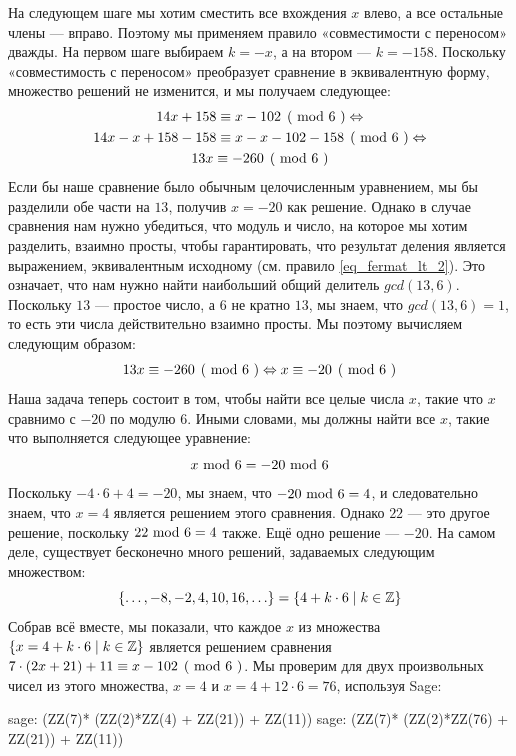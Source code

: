 \begin{example}
На следующем шаге мы хотим сместить все вхождения $x$ влево, а все остальные члены — вправо. Поэтому мы применяем правило «совместимости с переносом» дважды. На первом шаге выбираем $k=-x$, а на втором — $k=-158$.  Поскольку «совместимость с переносом» преобразует сравнение в эквивалентную форму, множество решений не изменится, и мы получаем следующее:
\begin{multline*}
\kongru{14x +158}{x-102}{6} \Leftrightarrow\\
\kongru{14x-x +158-158}{x-x-102-158}{6} \Leftrightarrow \\
\kongru{13x}{-260}{6}
\end{multline*}
Если бы наше сравнение было обычным целочисленным уравнением, мы бы разделили обе части на $13$, получив $x=-20$ как решение. Однако в случае сравнения нам нужно убедиться, что модуль и число, на которое мы хотим разделить, взаимно просты, чтобы гарантировать, что результат деления является выражением, эквивалентным исходному (см. правило \ref{eq_fermat_lt_2}). Это означает, что нам нужно найти наибольший общий делитель $gcd(13,6)$. Поскольку $13$ — простое число, а $6$ не кратно $13$, мы знаем, что $gcd(13,6)=1$, то есть эти числа действительно взаимно просты. Мы поэтому вычисляем следующим образом:
$$
\kongru{13x}{-260}{6} \Leftrightarrow \kongru{x}{-20}{6}
$$
Наша задача теперь состоит в том, чтобы найти все целые числа $x$, такие что $x$ сравнимо с $-20$ по модулю $6$. Иными словами, мы должны найти все $x$, такие что выполняется следующее уравнение:
$$
x \text{ mod } 6 = -20 \text{ mod } 6
$$
Поскольку $-4\cdot 6 +4 = -20$, мы знаем, что $ -20 \text{ mod } 6 = 4$, и следовательно знаем, что $x=4$ является решением этого сравнения. Однако $22$ — это другое решение, поскольку $ 22 \text{ mod } 6 = 4$ также. Ещё одно решение — $-20$. На самом деле, существует бесконечно много решений, задаваемых следующим множеством:
$$
\{\ldots, -8,-2, 4,10, 16,\ldots\} = \{4+k\cdot 6 \;|\; k\in \mathbb{Z}\}
$$
Собрав всё вместе, мы показали, что каждое $x$ из множества $\{x=4+k\cdot 6 \;|\; k\in \mathbb{Z}\}$ является решением сравнения $\kongru{7\cdot(2x+21) + 11}{x-102}{6}$. Мы проверим для двух произвольных чисел из этого множества, $x=4$ и $x=4 + 12\cdot 6 = 76$, используя Sage:
\begin{sagecommandline}
sage: (ZZ(7)* (ZZ(2)*ZZ(4) + ZZ(21)) + ZZ(11))  %
sage: (ZZ(7)* (ZZ(2)*ZZ(76) + ZZ(21)) + ZZ(11))  %
\end{sagecommandline}
\end{example}
